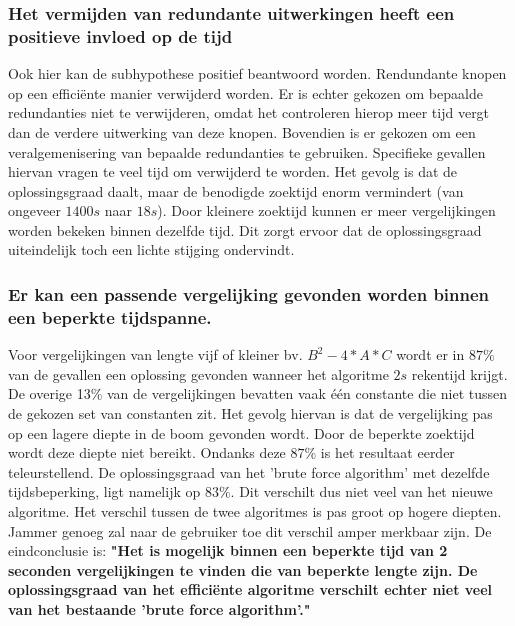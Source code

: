 \documentclass[Main.tex]{subfiles}
\begin{document}
\subsubsection{Het vermijden van redundante uitwerkingen heeft een positieve invloed op de tijd}
Ook hier kan de subhypothese positief beantwoord worden. Rendundante knopen op een effici\"ente manier verwijderd worden. Er is echter gekozen om bepaalde redundanties niet te verwijderen, omdat het controleren hierop meer tijd vergt dan de verdere uitwerking van deze knopen. Bovendien is er gekozen om een veralgemenisering van bepaalde redundanties te gebruiken. Specifieke gevallen hiervan vragen te veel tijd om verwijderd te worden. Het gevolg is dat de oplossingsgraad daalt, maar de benodigde zoektijd enorm vermindert (van ongeveer $1400s$ naar $18s$). Door kleinere zoektijd kunnen er meer vergelijkingen worden bekeken binnen dezelfde tijd. Dit zorgt ervoor dat de oplossingsgraad uiteindelijk toch een lichte stijging ondervindt.

\subsubsection{Er kan een passende vergelijking gevonden worden binnen een beperkte tijdspanne.}
Voor vergelijkingen van lengte vijf of kleiner bv. $B^{2} - 4 \ast A \ast C$ wordt er in $87\%$ van de gevallen een oplossing gevonden wanneer het algoritme $2s$ rekentijd krijgt. De overige 13\% van de vergelijkingen bevatten vaak \'e\'en constante die niet tussen de gekozen set van constanten zit. Het gevolg hiervan is dat de vergelijking pas op een lagere diepte in de boom gevonden wordt. Door de beperkte zoektijd wordt deze diepte niet bereikt. Ondanks deze $87\%$ is het resultaat eerder teleurstellend. De oplossingsgraad van het 'brute force algorithm' met dezelfde tijdsbeperking, ligt namelijk op $83\%$. Dit verschilt dus niet veel van het nieuwe algoritme. Het verschil tussen de twee algoritmes is pas groot op hogere diepten. Jammer genoeg zal naar de gebruiker toe dit verschil amper merkbaar zijn. De eindconclusie is: \textbf{"Het is mogelijk binnen een beperkte tijd van 2 seconden vergelijkingen te vinden die van beperkte lengte zijn. De oplossingsgraad van het effici\"ente algoritme verschilt echter niet veel van het bestaande 'brute force algorithm'."}
\end{document}
